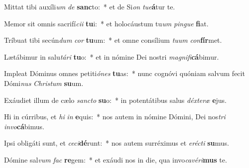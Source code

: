 \item Mittat tibi auxíli\textit{um} \textit{de} \textbf{sanc}to:~* et de Si\textit{on} \textit{tu}\textit{e}\textbf{á}tur te.
\item Memor sit omnis sacrifí\textit{ci}\textit{i} \textbf{tu}i:~* et holocáustum tu\textit{um} \textit{pin}\textit{gue} \textbf{fi}at.
\item Tríbuat tibi secún\textit{dum} \textit{cor} \textbf{tu}um:~* et omne consílium \textit{tu}\textit{um} \textit{con}\textbf{fír}met.
\item Lætábimur in salu\textit{tá}\textit{ri} \textbf{tu}o:~* et in nómine Dei nostri \textit{ma}\textit{gni}\textit{fi}\textbf{cá}bimur.
\item Impleat Dóminus omnes petiti\textit{ó}\textit{nes} \textbf{tu}as:~* nunc cognóvi quóniam salvum fecit Dómi\textit{nus} \textit{Chris}\textit{tum} \textbf{su}um.
\item Exáudiet illum de cælo \textit{sanc}\textit{to} \textbf{su}o:~* in potentátibus salus \textit{déx}\textit{te}\textit{ræ} \textbf{e}jus.
\item Hi in cúrribus, et \textit{hi} \textit{in} \textbf{e}quis:~* nos autem in nómine Dómini, Dei nos\textit{tri} \textit{in}\textit{vo}\textbf{cá}bimus.
\item Ipsi obligáti sunt, et \textit{ce}\textit{ci}\textbf{dé}runt:~* nos autem surréximus et \textit{e}\textit{réc}\textit{ti} \textbf{su}mus.
\item Dómine sal\textit{vum} \textit{fac} \textbf{re}gem:~* et exáudi nos in die, qua invo\textit{ca}\textit{vé}\textit{ri}\textbf{mus} te.

